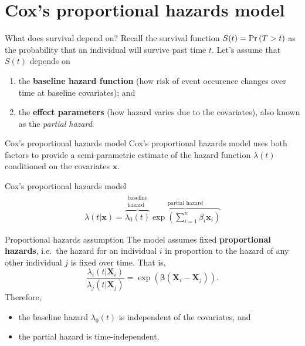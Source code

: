 \section[Cox model]{Cox's proportional hazards model}
\begin{frame}{What does survival depend on?}
    Recall the survival function $S(t)=\Pr{\left(T>t\right)}$ as the probability that an individual will survive past time $t$.
    \pause
    Let's assume that $S(t)$ depends on
    \begin{enumerate}
        \item the \textbf{baseline hazard function} (how risk of event occurence changes over time at baseline covariates); and
        \item the \textbf{effect parameters} (how hazard varies due to the covariates), also known as the \emph{partial hazard}.
    \end{enumerate}
\end{frame}
\begin{frame}{Cox's proportional hazards model}
    Cox's proportional hazards model uses both factors to provide a semi-parametric estimate of the hazard function $\lambda(t)$ conditioned on the covariates $\mathbf{x}$.
    
    \begin{block}{Cox's proportional hazards model}
        \begin{align*}
            \lambda(t | \mathbf{x}) = \overbrace{\lambda_0(t)}^{\substack{\text{baseline}\\\text{hazard}}} \overbrace{\exp \left( \sum_{i=1}^n \beta_i \mathbf{x}_i \right)}^{\text{partial hazard}}
        \end{align*}
    \end{block}
\end{frame}
\begin{frame}{Proportional hazards assumption}
    The model assumes fixed \textbf{proportional hazards}, i.e.\ the hazard for an individual $i$ in proportion to the hazard of any other individual $j$ is fixed over time.
    \pause
    That is,
    \begin{equation*}
        \frac{\lambda_i(t|\mathbf{X}_i)}{\lambda_j(t|\mathbf{X}_j)} = \exp\left(\boldsymbol{\beta}(\mathbf{X}_i - \mathbf{X}_j)\right).
    \end{equation*}
    \pause
    Therefore,
    \begin{itemize}
        \item the baseline hazard $\lambda_0(t)$ is independent of the covariates, and
        \item the partial hazard is time-independent.
    \end{itemize}
\end{frame}
